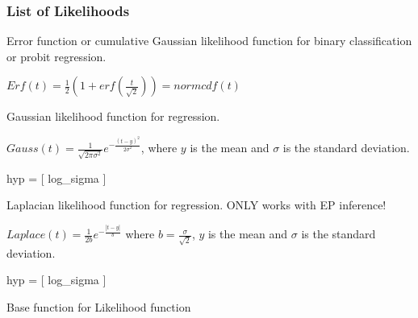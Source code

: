 \documentclass[letterpaper,10pt,english]{sphinxmanual}
\begin{document}
\subsubsection{List of Likelihoods}
\label{Likelihoods:list-of-likelihoods}\label{Likelihoods:module-pyGPs.Core.lik}

\begin{fulllineitems}
\label{Likelihoods:pyGPs.Core.lik.Erf}
Error function or cumulative Gaussian likelihood function for binary
classification or probit regression.

$Erf(t)=\frac{1}{2}(1+erf(\frac{t}{\sqrt{2}}))=normcdf(t)$

\end{fulllineitems}


\begin{fulllineitems}
\label{Likelihoods:pyGPs.Core.lik.Gauss}
Gaussian likelihood function for regression.

$Gauss(t)=\frac{1}{\sqrt{2\pi\sigma^2}}e^{-\frac{(t-y)^2}{2\sigma^2}}$,
where $y$ is the mean and $\sigma$ is the standard deviation.

hyp = {[} log\_sigma {]}

\end{fulllineitems}


\begin{fulllineitems}
\label{Likelihoods:pyGPs.Core.lik.Laplace}
Laplacian likelihood function for regression. ONLY works with EP inference!

$Laplace(t) = \frac{1}{2b}e^{-\frac{|t-y|}{b}}$ where $b=\frac{\sigma}{\sqrt{2}}$,
$y$ is the mean and $\sigma$ is the standard deviation.

hyp = {[} log\_sigma {]}

\end{fulllineitems}


\begin{fulllineitems}
\label{Likelihoods:pyGPs.Core.lik.Likelihood}
Base function for Likelihood function

\end{fulllineitems}
\end{document}
